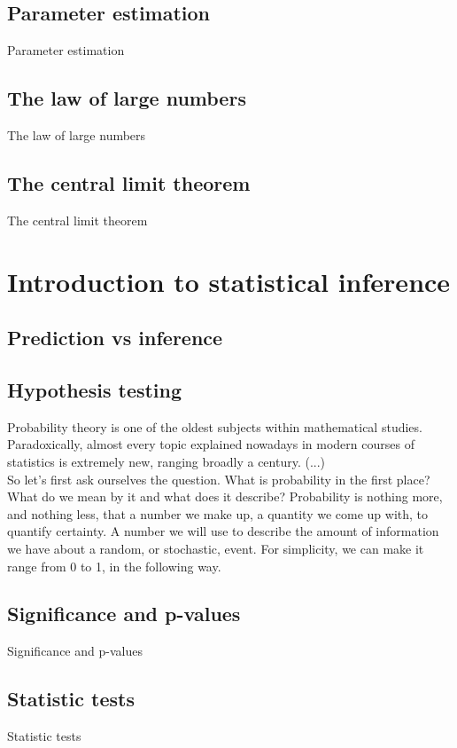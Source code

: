 \documentclass{book}
\begin{document}
\section{Parameter estimation}
Parameter estimation

\section{The law of large numbers}
The law of large numbers

\section{The central limit theorem}
The central limit theorem


\chapter{Introduction to statistical inference}

\section{Prediction vs inference}

\section{Hypothesis testing}
Probability theory is one of the oldest subjects within mathematical studies. Paradoxically, almost every topic explained nowadays in modern courses of statistics is extremely new, ranging broadly a century. (...)\\

So let's first ask ourselves the question. What is probability in the first place? What do we mean by it and what does it describe? Probability is nothing more, and nothing less, that a number we make up, a quantity we come up with, to quantify certainty. A number we will use to describe the amount of information we have about a random, or stochastic, event. For simplicity, we can make it range from 0 to 1, in the following way.

\section{Significance and p-values}
Significance and p-values

\section{Statistic tests}
Statistic tests
\end{document}
